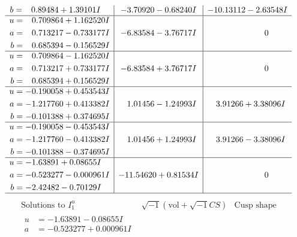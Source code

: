 \documentclass[1p]{elsarticle_modified}
\theoremstyle{definition}
\newcommand{\I}{\sqrt{-1}}
\begin{document}
$$\begin{array}{c|c|c}
\begin{aligned}
b &= \phantom{-}0.89484 + 1.39101 I\end{aligned}
 & -3.70920 - 0.68240 I & -10.13112 - 2.63548 I \\ \hline\begin{aligned}
u &= \phantom{-}0.709864 + 1.162520 I \\
a &= \phantom{-}0.713217 - 0.733177 I \\
b &= \phantom{-}0.685394 - 0.156529 I\end{aligned}
 & -6.83584 - 3.76717 I & \phantom{-0.000000 } 0 \\ \hline\begin{aligned}
u &= \phantom{-}0.709864 - 1.162520 I \\
a &= \phantom{-}0.713217 + 0.733177 I \\
b &= \phantom{-}0.685394 + 0.156529 I\end{aligned}
 & -6.83584 + 3.76717 I & \phantom{-0.000000 } 0 \\ \hline\begin{aligned}
u &= -0.190058 + 0.453543 I \\
a &= -1.217760 + 0.413382 I \\
b &= -0.101388 + 0.374695 I\end{aligned}
 & \phantom{-}1.01456 - 1.24993 I & \phantom{-}3.91266 + 3.38096 I \\ \hline\begin{aligned}
u &= -0.190058 - 0.453543 I \\
a &= -1.217760 - 0.413382 I \\
b &= -0.101388 - 0.374695 I\end{aligned}
 & \phantom{-}1.01456 + 1.24993 I & \phantom{-}3.91266 - 3.38096 I \\ \hline\begin{aligned}
u &= -1.63891 + 0.08655 I \\
a &= -0.523277 - 0.000961 I \\
b &= -2.42482 - 0.70129 I\end{aligned}
 & -11.54620 + 0.81534 I & \phantom{-0.000000 } 0\\
 \hline 
 \end{array}$$\newpage$$\begin{array}{c|c|c}  
\text{Solutions to }I^u_{1}& \I (\text{vol} + \sqrt{-1}CS) & \text{Cusp shape}\\
 \hline 
\begin{aligned}
u &= -1.63891 - 0.08655 I \\
a &= -0.523277 + 0.000961 I \\

\end{aligned}
\end{array}$$
\end{document}
